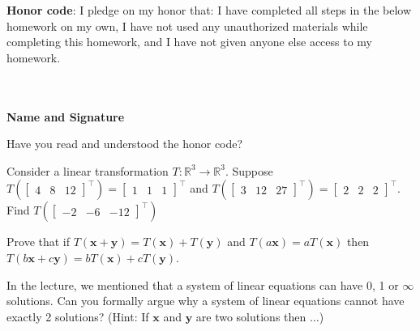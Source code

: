 \documentclass[solution,addpoints,12pt]{exam}
\begin{document}
\noindent \textbf{Honor code}: I pledge on my honor that: I have completed all steps in the below homework on my own, I have not used any unauthorized materials while completing this homework, and I have not given anyone else access to my homework.
\\~\\~\\
\begin{flushright}
\textbf{Name and Signature}

\end{flushright}


\begin{questions}

\question[1] Have you read and understood the honor code?
\begin{solution}

\end{solution}


\question[1] Consider a linear transformation $T: \mathbb{R}^3 \rightarrow \mathbb{R}^3$. Suppose $T (\begin{bmatrix}4 & 8& 12\end{bmatrix}^\top) = \begin{bmatrix}1 & 1& 1\end{bmatrix}^\top$ and $T (\begin{bmatrix}3 & 12& 27\end{bmatrix}^\top) = \begin{bmatrix}2 & 2& 2\end{bmatrix}^\top$. Find $T (\begin{bmatrix}-2 & -6& -12\end{bmatrix}^\top)$
\begin{solution}
\end{solution}

\question[1] Prove that if $T(\mathbf{x} + \mathbf{y}) = T(\mathbf{x}) + T(\mathbf{y})$ and $T(a\mathbf{x}) = a T(\mathbf{x})$ then $T(b\mathbf{x} + c\mathbf{y}) = bT(\mathbf{x}) + cT(\mathbf{y})$.
\begin{solution}
\end{solution}

\question[2] In the lecture, we mentioned that a system of linear equations can have 0, 1 or $\infty$ solutions. Can you formally argue why a system of linear equations cannot have exactly 2 solutions? (Hint: If $\mathbf{x}$ and $\mathbf{y}$ are two solutions then $\dots$)  
\begin{solution}
\end{solution}


\end{questions}
\end{document}
